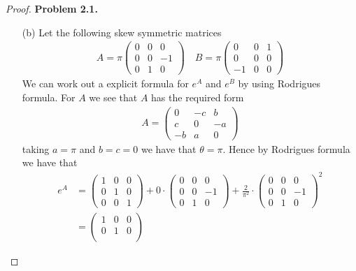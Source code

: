 \documentclass[11pt]{article}
\theoremstyle{definition}
\begin{document}
\begin{proof}{\textbf{Problem 2.1.}}
\begin{itemize}
    \item [(b)] Let the following skew symmetric matrices
    \begin{align*}
        A = \pi\begin{pmatrix}
            0 & 0 & 0\\
            0 & 0 & -1\\
            0 & 1 & 0
        \end{pmatrix}
        \quad
        B = \pi\begin{pmatrix}
            0 & 0 & 1\\
            0 & 0 & 0\\
            -1 & 0 & 0
        \end{pmatrix}
    \end{align*}
    We can work out a explicit formula for $e^A$ and $e^B$ by using
    Rodrigues formula. For $A$ we see that $A$ has the required form
    \begin{align*}
        A = \begin{pmatrix}
            0 & -c & b\\
            c & 0 & -a\\
            -b & a & 0
        \end{pmatrix}
    \end{align*}
    taking $a = \pi$ and $b = c = 0$ we have that $\theta = \pi$.
    Hence by Rodrigues formula we have that
    \begin{align*}
        e^A &= \begin{pmatrix}
            1 & 0 & 0\\
            0 & 1 & 0\\
            0 & 0 & 1
        \end{pmatrix}
        + 0 \cdot \begin{pmatrix}
            0 & 0 & 0\\
            0 & 0 & -1\\
            0 & 1 & 0
        \end{pmatrix}
        + \frac{2}{\pi^2} \cdot \begin{pmatrix}
            0 & 0 & 0\\
            0 & 0 & -1\\
            0 & 1 & 0
        \end{pmatrix}^2\\
        &= \begin{pmatrix}
            1 & 0 & 0\\
            0 & 1 & 0\\

\end{pmatrix}
\end{align*}
\end{itemize}
\end{proof}
\end{document}

